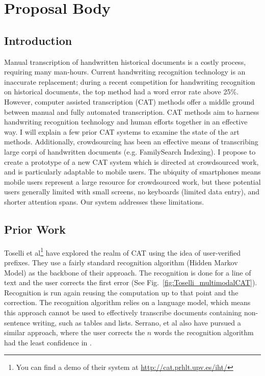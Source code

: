 \documentclass[conference]{IEEEtran}
\begin{document}
\section{Proposal Body}

\subsection{Introduction} %
Manual transcription of handwritten historical documents is a costly process, requiring many man-hours. Current handwriting recognition technology is an inaccurate replacement; during a recent competition for handwriting recognition on historical documents, the top method had a word error rate above 25\%\cite{icdarComp2015}.  However, computer assisted transcription (CAT) methods offer a middle ground between manual and fully automated transcription. CAT methods aim to harness handwriting recognition technology and human efforts together in an effective way. I will explain a few prior CAT systems to examine the state of the art methods. Additionally, crowdsourcing has been an effective means of transcribing large corpi of handwritten documents (e.g. FamilySearch Indexing). I propose to create a prototype of a new CAT system which is directed at crowdsourced work, and is particularly adaptable to mobile users. The ubiquity of smartphones means mobile users represent a large resource for crowdsourced work, but these potential users generally limited with small screens, no keyboards (limited data entry), and shorter attention spans. Our system addresses these limitations.

\subsection{Prior Work}
Toselli et al\cite{Toselli2010}\footnote{You can find a demo of their system at \url{http://cat.prhlt.upv.es/iht/}} have explored the realm of CAT using the idea of user-verified prefixes. They use a fairly standard recognition algorithm (Hidden Markov Model) as the backbone of their approach. The recognition is done for a line of text and the user corrects the first error (See Fig.~\ref{fig:Toselli_multimodalCAT}). Recognition is run again reusing the computation up to that point and the correction. The recognition algorithm relies on a language model, which means this approach cannot be used to effectively transcribe documents containing non-sentence writing, such as tables and lists. Serrano, et al also have pursued a similar approach, where the user corrects the $n$ words the recognition algorithm had the least confidence in \cite{Serrano2014}.
\end{document}
